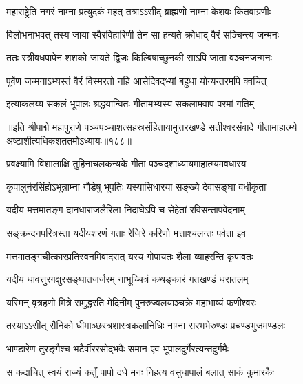 \twolineshloka
{महाराष्ट्रेति नगरं नाम्ना प्रत्युदकं महत्}
{तत्राऽऽसीद् ब्राह्मणो नाम्ना केशवः कितवाग्रणीः} %

\twolineshloka
{विलोभनाभवत् तस्य जाया स्वैरविहारिणी}
{तेन सा हन्यते क्रोधाद् वैरं सञ्चिन्त्य जन्मनः} %

\twolineshloka
{ततः स्त्रीवधपापेन शशको जायते द्विजः}
{किल्बिषाच्छुनकी साऽपि जाता वञ्चनजन्मनः} %

\twolineshloka
{पूर्वेण जन्मनाऽभ्यस्तं वैरं विस्मरतो नहि}
{आसेदिवद्भ्यां बहुधा योन्यन्तरमपि क्वचित्} %

\twolineshloka
{इत्याकलय्य सकलं भूपालः श्रद्धयान्वितः}
{गीतामभ्यस्य सकलामवाप परमां गतिम्} %

॥इति श्रीपाद्मे महापुराणे पञ्चपञ्चाशत्सहस्रसंहितायामुत्तरखण्डे सतीश्वरसंवादे गीतामाहात्म्ये अष्टाशीत्यधिकशततमोऽध्यायः॥१८८॥

\genMangalaShloka

\closesub

\ganapatyadiDhyanam
\padmaPuranam



\twolineshloka
{प्रवक्ष्यामि विशालाक्षि तुहिनाचलकन्यके}
{गीता पञ्चदशाध्यायमाहात्म्यमवधारय} %

\twolineshloka
{कृपालुर्नरसिंहोऽभून्नाम्ना गौडेषु भूपतिः}
{यस्यासिधारया सङ्ख्ये देवासङ्घा वधीकृताः} %

\twolineshloka
{यदीय मत्तमातङ्ग दानधाराजलैरिला}
{निदाघेऽपि च सेहेतां रविसन्तापवेदनाम्} %

\twolineshloka
{सङ्क्रन्दनपरित्रस्ता यदीयशरणं गताः}
{रेजिरे करिणो मत्ताश्चलन्तः पर्वता इव} %

\twolineshloka
{मत्तमातङ्गचीत्कारप्रतिस्वनमिवादरात्}
{यस्य गोपायतः शैला व्याहरन्ति कृपावतः} %

\twolineshloka
{यदीय धावत्तुरगक्षुरसङ्घातजर्जरम्}
{नाभूच्चित्रं कथङ्कारं गतखण्डं धरातलम्} %

\twolineshloka
{यस्मिन् वृत्रहणो मित्रे समुद्धरति मेदिनीम्}
{पुनरुज्वलयाञ्चक्रे महाभाष्यं फणीश्वरः} %

\twolineshloka
{तस्याऽऽसीत् सैनिको धीमाञ्छस्त्रशास्त्रकलानिधिः}
{नाम्ना सरभभेरुण्डः प्रचण्डभुजमण्डलः} %

\twolineshloka
{भाण्डारेण तुरङ्गैश्च भटैर्वीररसोद्भवैः}
{समान एव भूपालदुर्गैरत्यन्तदुर्गमैः} %

\twolineshloka
{स कदाचित् स्वयं राज्यं कर्तुं पापो दधे मनः}
{निहत्य वसुधापालं बलात् साकं कुमारकैः} %

